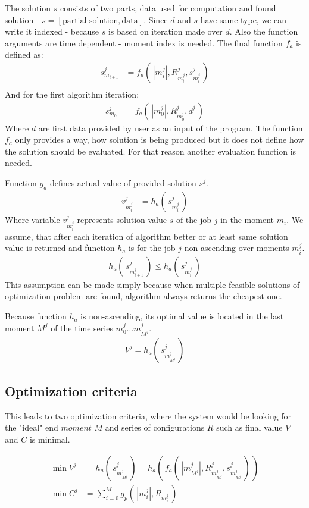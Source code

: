 The solution $s$ consists of two parts, data used for computation and found solution - $s = [\text{partial solution}, \text{data}]$.
Since $d$ and $s$ have same type, we can write it indexed - because $s$ is based on iteration made over $d$.
Also the function arguments are time dependent - moment index is needed.
The final function $f_{a}$ is defined as:
\begin{align*}
	s_{m_{i+1}}^{j} & = f_{a}(\, |m_{i}^{j}|, R_{m_{i}^{j}}^{j}, s_{m_{i}^{j}}^{j}\,) \\
\end{align*}
And for the first algorithm iteration:
\begin{align*}
	s_{m_{0}}^{j} & = f_{a}(\, |m_{0}^{j}|, R_{m_{0}^{j}}^{j}, d^{j}\,) 
\end{align*}
Where $d$ are first data provided by user as an input of the program.
The function $f_{a}$ only provides a way,
how solution is being produced but it does not define how the solution should be evaluated.
For that reason another evaluation function is needed.

\bigskip

\noindent Function $g_{a}$ defines actual value of provided solution $s^{j}$.
\begin{align*}
	v_{m_{i}^{j}}^{j} & = h_{a}(\, s_{m_{i}^{j}}^{j} \,) 
\end{align*}
Where variable $v_{m_{i}^{j}}^{j}$ represents solution value $s$ of the job $j$ in the moment $m_{i}$.
We assume, that after each iteration of algorithm better or at least same solution value is returned
and function $h_{a}$ is for the job $j$ non-ascending over moments $m_{i}^{j}$.
\begin{align*}
	h_{a}(\, s_{m_{i+1}^{j}}^{j} \,) \leq h_{a}(\, s_{m_{i}^{j}}^{j} \,) 
\end{align*}
This assumption can be made simply because when multiple feasible solutions of optimization problem are found,
algorithm always returns the cheapest one.

Because function $h_{a}$ is non-ascending,
its optimal value is located in the last moment $M^j$ of the time series $m_{0}^{j} \dots m_{M^{j}}^{j}$.
\begin{align*}
	V^{j} = h_{a}(\, s_{m_{M^{j}}^{j}}^{j} \,) 
\end{align*}

\subsection{Optimization criteria}\label{subsec:detailed-optimization-criteria}
This leads to two optimization criteria, 
where the system would be looking for the "ideal" end $moment$ $M$ 
and series of configurations $R$ such as final value $V$ and $C$ is minimal.

\begin{align*}
	\min V^{j} & = h_{a}(\, s_{m_{M^{j}}^{j}}^{j} \,) = h_{a}(\, f_{a}(\, |m_{M^{j}}^{j}|, R_{m_{M^{j}}^{j}}^{j}, s_{m_{M^{j}}^{j}}^{j}\,) \,) \\
	\min C^{j} & = \sum_{i = 0}^{M} g_{p} (\, |m_{i}^{j}|, R_{m_{i}^{j}} \,)                                                                   
\end{align*}